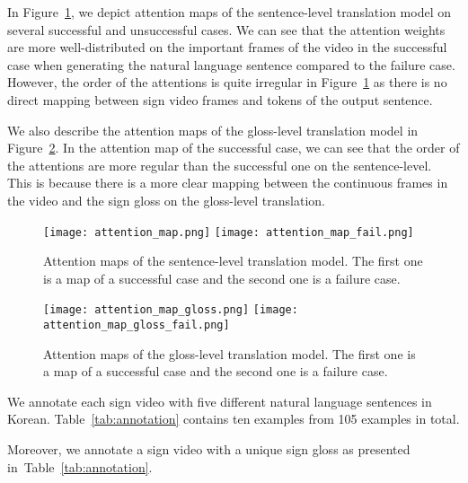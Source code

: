 \documentclass[10pt,twocolumn,letterpaper]{article}
\begin{document}
 In Figure~\ref{fig:attention}, we depict attention maps of the sentence-level translation model on several successful and unsuccessful cases. We can see that the attention weights are more well-distributed on the important frames of the video in the successful case when generating the natural language sentence compared to the failure case.  However, the order of the attentions is quite irregular in Figure~\ref{fig:attention} as there is no direct mapping between sign video frames and tokens of the output sentence.

We also describe the attention maps of the gloss-level translation model in Figure~\ref{fig:attention_gloss}. In the attention map of the successful case, we can see that the order of the attentions are more regular than the successful one on the sentence-level. This is because there is a more clear mapping between the continuous frames in the video and the sign gloss on the gloss-level translation.\\


\begin{figure}[ht]
\centering
\texttt{[image: attention\_map.png]}
\texttt{[image: attention\_map\_fail.png]}
\caption{Attention maps of the sentence-level translation model. The first one is a map of a successful case and the second one is a failure case.}
\label{fig:attention}
\end{figure}

\begin{figure}[ht]
\centering
\texttt{[image: attention\_map\_gloss.png]}
\texttt{[image: attention\_map\_gloss\_fail.png]}
\caption{Attention maps of the gloss-level translation model. The first one is a map of a successful case and the second one is a failure case.}
\label{fig:attention_gloss}
\end{figure}


 We annotate each sign video with five different natural language sentences in Korean.
Table~\ref{tab:annotation} contains ten examples from 105 examples in total.

Moreover, we annotate a sign video with a unique sign gloss as presented in~Table~\ref{tab:annotation}.

\begin{table*}[ht]
\caption{Ten examples of our sign language annotations. We annotate each sign with five natural language sentences in Korean and a unique sign gloss. We only provide two sentences in the table due to space limitations.}
\label{tab:annotation}
\end{table*}
\end{document}

